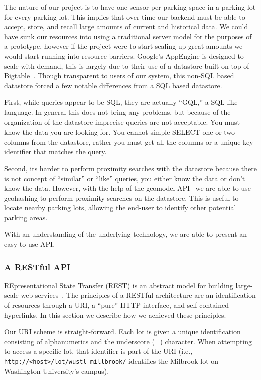 \documentclass{acm_proc}
\begin{document}
The nature of our project is to have one sensor per parking space in a
parking lot for every parking lot.
This implies that over time our backend must be able to accept, store, and
recall large amounts of current and historical data.
We could have sunk our resources into using a traditional server model for
the purposes of a prototype, however if the project were to start scaling
up great amounts we would start running into resource barriers.
Google's AppEngine is designed to scale with demand, this is largely due to
their use of a datastore built on top of Bigtable~\cite{google:bigtable}.
Though transparent to users of our system, this non-SQL based datastore
forced a few notable differences from a SQL based datastore.

First, while queries appear to be SQL, they are actually ``GQL,'' a
SQL-like language.
In general this does not bring any problems, but because of the
organization of the datastore imprecise queries are not acceptable.
You must know the data you are looking for.
You cannot simple SELECT one or two columns from the datastore, rather you
must get all the columns or a unique key identifier that matches the query.

Second, its harder to perform proximity searches with the datastore because
there is not concept of ``similar'' or ``like'' queries, you either know
the data or don't know the data.
However, with the help of the geomodel API~\cite{geomodel} we are able to
use geohashing to perform proximity searches on the datastore.
This is useful to locate nearby parking lots, allowing the end-user to
identify other potential parking areas.

With an understanding of the underlying technology, we are able to present
an easy to use API.

\subsubsection{A RESTful API}

REpresentational State Transfer (REST) is an abstract model for building
large-scale web services~\cite{pautasso:restful}.
The principles of a RESTful architecture are an identification of resources
through a URI, a ``pure'' HTTP interface, and self-contained hyperlinks.
In this section we describe how we achieved these principles.

Our URI scheme is straight-forward.
Each lot is given a unique identification consisting of alphanumerics and
the underscore (\_) character.
When attempting to access a specific lot, that identifier is part of the
URI (i.e.,
\texttt{http://<host>/lot/wustl\_millbrook/}
identifies the Milbrook lot on Washington University's campus).
\end{document}
